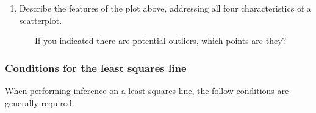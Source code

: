 \documentclass[
]{report}
\providecommand{\tightlist}{%
  \setlength{\itemsep}{0pt}\setlength{\parskip}{0pt}}
\begin{document}
\vspace{2in}

\begin{enumerate}
\def\labelenumi{\arabic{enumi}.}
\setcounter{enumi}{3}
\tightlist
\item
  Describe the features of the plot above, addressing all four characteristics of a scatterplot.
\end{enumerate}

\vspace{1in}

~~~~~~~If you indicated there are potential outliers, which points are they?

\vspace{0.5in}

\hypertarget{conditions-for-the-least-squares-line-1}{%
\subsubsection*{Conditions for the least squares line}\label{conditions-for-the-least-squares-line-1}}

When performing inference on a least squares line, the follow conditions are generally required:
\end{document}
